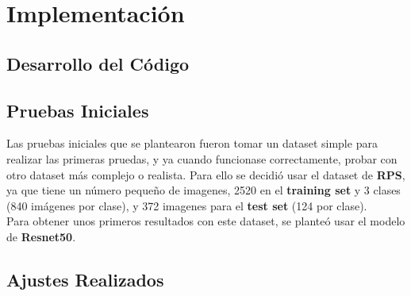 \chapter{Implementación}\label{ch:implementacion}

\section{Desarrollo del Código}\label{sec:desarrollo_del_codigo}

\section{Pruebas Iniciales}\label{sec:pruebas_iniciales}
Las pruebas iniciales que se plantearon fueron tomar un dataset simple para realizar las primeras pruedas, y ya cuando
funcionase correctamente, probar con otro dataset más complejo o realista.
Para ello se decidió usar el dataset de \textbf{RPS}, ya que tiene un número pequeño de imagenes, 2520 en el
\textbf{training set} y 3 clases (840 imágenes por clase), y 372 imagenes para el \textbf{test set} (124 por clase).
\\[6pt]

Para obtener unos primeros resultados con este dataset, se planteó usar el modelo de \textbf{Resnet50}.
\section{Ajustes Realizados}\label{sec:ajustes_realizados}
